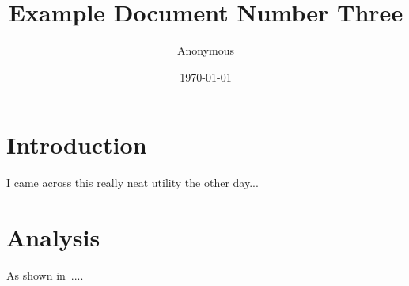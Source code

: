 \documentclass[11pt]{article}
\title{Example Document Number Three}
\author{Anonymous}
\date{\today}
\begin{document}
\maketitle
\section{Introduction}
I came across this really neat utility the other day...

\section{Analysis}
As shown in~\cite{en300.175-2v1.4.2}....


\end{document}
